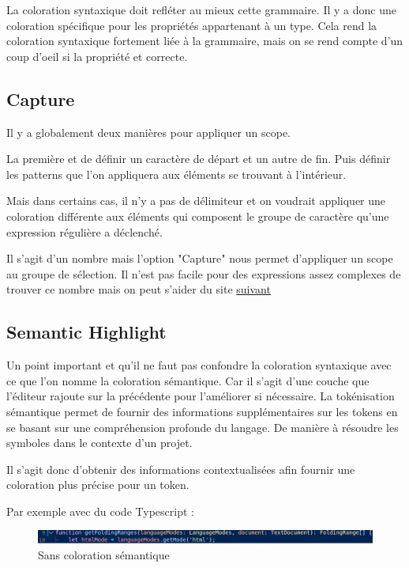 \documentclass[
    iict, %
    il, %
]{heig-tb}
\begin{document}
La coloration syntaxique doit refléter au mieux cette grammaire. Il y a donc une coloration spécifique pour les propriétés appartenant à un type.
Cela rend la coloration syntaxique fortement liée à la grammaire, mais on se rend compte d'un coup d'oeil si la propriété et correcte.


\subsection{Capture}

Il y a globalement deux manières pour appliquer un scope.

La première et de définir un caractère de départ et un autre de fin. Puis définir les patterns que l'on appliquera aux éléments se trouvant à l'intérieur.


Mais dans certains cas, il n'y a pas de délimiteur et on voudrait appliquer une coloration différente aux éléments qui composent le groupe de caractère qu'une expression régulière
a déclenché.

Il s'agit d'un nombre mais l'option "Capture" nous permet d'appliquer un scope au groupe de sélection.
Il n'est pas facile pour des expressions assez complexes de trouver ce nombre mais on peut s'aider du site \href{https://regex101.com/}{suivant}

\subsection{Semantic Highlight}

Un point important et qu'il ne faut pas confondre la coloration syntaxique avec ce que l'on nomme la coloration sémantique. Car il s'agit d'une couche que l'éditeur rajoute sur la précédente pour l'améliorer si nécessaire.
La tokénisation sémantique permet de fournir des informations supplémentaires sur les tokens en se basant sur une compréhension profonde du langage.
De manière à résoudre les symboles dans le contexte d'un projet.

Il s'agit donc d'obtenir des informations contextualisées afin fournir une coloration plus précise pour un token.

Par exemple avec du code Typescript :

\begin{figure}[!h]
    \begin{center}
        \includegraphics[width=15cm]{assets/figures/semantic-coloration-without.png}
    \end{center}
    \caption[Sans coloration sémantique]{\label{semantic-coloration-without} Sans coloration sémantique}
\end{figure}
\end{document}
